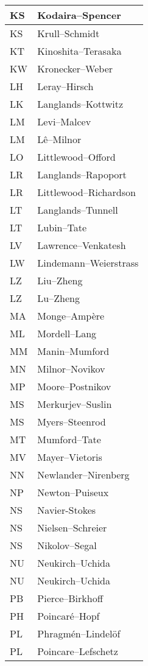 \documentclass{amsart}
\numberwithin{equation}{section}
\theoremstyle{plain}
\numberwithin{equation}{section}
\theoremstyle{remark}
\begin{document}
\begin{multicols}{2}
{\begin{longtable}{l|l}
KS & Kodaira--Spencer\\ \hline
KS & Krull--Schmidt\\ \hline
KT & Kinoshita--Terasaka\\ \hline
KW & Kronecker--Weber\\ \hline
LH & Leray--Hirsch\\ \hline
LK & Langlands--Kottwitz\\ \hline
LM & Levi--Malcev\\ \hline
LM & Lê--Milnor\\ \hline
LO & Littlewood--Offord\\ \hline
LR & Langlands--Rapoport\\ \hline
LR & Littlewood--Richardson\\ \hline
LT & Langlands--Tunnell\\ \hline
LT & Lubin--Tate\\ \hline
LV & Lawrence--Venkatesh\\ \hline
LW & Lindemann--Weierstrass\\ \hline
LZ & Liu--Zheng\\ \hline
LZ & Lu--Zheng\\ \hline
MA & Monge--Ampère\\ \hline
ML & Mordell--Lang\\ \hline
MM & Manin--Mumford\\ \hline
MN & Milnor--Novikov\\ \hline
MP & Moore--Postnikov\\ \hline
MS & Merkurjev--Suslin\\ \hline
MS & Myers--Steenrod\\ \hline
MT & Mumford--Tate\\ \hline
MV & Mayer--Vietoris\\ \hline
NN & Newlander--Nirenberg\\ \hline
NP & Newton--Puiseux\\ \hline
NS & Navier-Stokes\\ \hline
NS & Nielsen--Schreier\\ \hline
NS & Nikolov--Segal\\ \hline
NU & Neukirch--Uchida\\ \hline
NU & Neukirch--Uchida\\ \hline
PB & Pierce--Birkhoff\\ \hline
PH & Poincaré--Hopf\\ \hline
PL & Phragmén--Lindelöf\\ \hline
PL & Poincare--Lefschetz\\ \hline

\end{longtable}}
\end{multicols}
\end{document}
